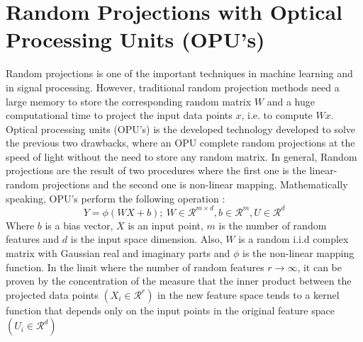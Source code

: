 \section{Random Projections with Optical Processing Units (OPU's)}
Random projections is one of the important techniques in machine learning and in signal processing. However, traditional random projection methods need a large memory to store the corresponding random matrix $W$ and a huge computational time to project the input data points $x$, i.e. to compute $Wx$. Optical processing units (OPU's) is the developed technology developed to solve the previous two drawbacks, where an OPU complete random projections at the speed of light without the need to store any random matrix. In general, Random projections are the result of two procedures where the first one is the linear-random projections and the second one is non-linear mapping.
Mathematically speaking, OPU's perform the following operation \citep{saade_opu}:
\begin{equation}
\label{OPU_equation}
    Y=\phi(WX+b);~W\in \mathcal{R}^{m\times d},b\in \mathcal{R}^m, U\in \mathcal{R}^d
\end{equation}
Where $b$ is a bias vector, $X$ is an input point, $m$ is the number of random features and $d$ is the input space dimension. Also, $W$ is a random i.i.d complex matrix with Gaussian real and imaginary parts and $\phi$ is the non-linear mapping function.\newline
In the limit where the number of random features $r\xrightarrow{}\infty$, it can be proven by the concentration of the measure that the inner product between the projected data points $(X_i\in \mathcal{R}^r)$ in the new feature space tends to a kernel function that depends only on the input points in the original feature space $(U_i\in \mathcal{R}^d)$

